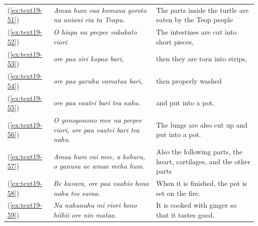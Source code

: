 \documentclass[output=paper]{langscibook}
\begin{document}
\begin{xltabular}{\textwidth}{lXX}
	(\ref{ex:text19-51})&\textit{Amaa hum vaa komana goroto na aniani ria ta Teapu.}&The parts inside the turtle are eaten by the Teop people\\
	(\ref{ex:text19-52})&\textit{O hiapa na peepee vakakato riori}&The intestines are cut into short pieces,\\
	(\ref{ex:text19-53})&\textit{ore paa siri kopaa bari,}&then they are torn into strips,\\
	(\ref{ex:text19-54})&\textit{ore paa garuhu vamataa bari,}&then properly washed\\
	(\ref{ex:text19-55})&\textit{ore paa vaatei bari tea nahu.}&and put into a pot.\\
	(\ref{ex:text19-56})&\textit{O gonogonono mee na peepee riori, ore paa vaatei bari tea nahu.}&The lungs are also cut up and put into a pot.\\
	(\ref{ex:text19-57})&\textit{Amaa hum vai mee, a koburu, o ganusu ae amaa meha hum.}&Also the following parts, the heart, cartilages, and the other parts\\
	(\ref{ex:text19-58})&\textit{Be kavara, ore paa vaahio bona nahu teo suraa.}&When it is finished, the pot is set on the fire.\\
	(\ref{ex:text19-59})&\textit{Na nahunahu mi riori bono hiihii ore nin mataa.}&It is cooked with ginger so that it tastes good.\\
\end{xltabular}
\end{document}
